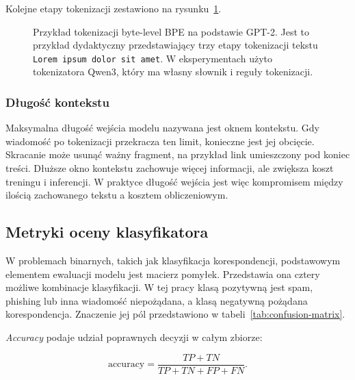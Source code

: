 Kolejne etapy tokenizacji zestawiono na
rysunku~\ref{fig:bpe-tokenization-gpt2}.

\begin{figure}[H]
\centering
\resizebox{\textwidth}{!}{}
\caption[Przykład tokenizacji byte-level BPE na podstawie GPT-2]{Przykład
tokenizacji byte-level BPE na podstawie GPT-2. Jest to przykład dydaktyczny
przedstawiający trzy etapy tokenizacji tekstu \texttt{Lorem ipsum dolor sit
amet}. W eksperymentach użyto tokenizatora Qwen3, który ma własny słownik i
reguły tokenizacji.}
\label{fig:bpe-tokenization-gpt2}
\end{figure}

\subsubsection{Długość kontekstu}

Maksymalna długość wejścia modelu nazywana jest oknem kontekstu. Gdy wiadomość
po tokenizacji przekracza ten limit, konieczne jest jej obcięcie. Skracanie
może usunąć ważny fragment, na przykład link umieszczony pod koniec treści.
Dłuższe okno kontekstu zachowuje więcej informacji, ale zwiększa koszt treningu
i inferencji. W praktyce długość wejścia jest więc kompromisem między ilością
zachowanego tekstu a kosztem obliczeniowym.

\subsection{Metryki oceny klasyfikatora}

W problemach binarnych, takich jak klasyfikacja korespondencji, podstawowym elementem ewaluacji modelu jest macierz pomyłek.
Przedstawia ona cztery możliwe kombinacje klasyfikacji.
W tej pracy klasą pozytywną jest spam, phishing lub inna wiadomość niepożądana, a klasą negatywną pożądana korespondencja.
Znaczenie jej pól przedstawiono w tabeli~\ref{tab:confusion-matrix}.

\begin{table}[H]
    \centering
    \caption{Macierz pomyłek dla binarnej klasyfikacji wiadomości}
    \label{tab:confusion-matrix}
    \renewcommand{\arraystretch}{1.25}
    
\end{table}

\emph{Accuracy} podaje udział poprawnych decyzji w całym zbiorze:

\[
\mathrm{accuracy} =
\frac{TP + TN}{TP + TN + FP + FN}.
\]

